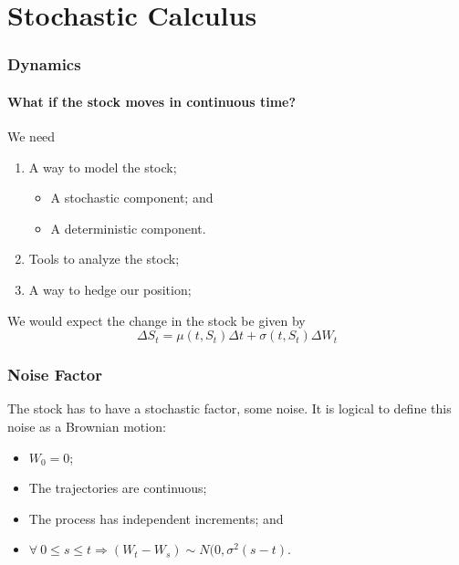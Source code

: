 \documentclass{beamer}
\begin{document}
\section{Stochastic Calculus}
\begin{frame}
\frametitle{Dynamics}
\framesubtitle{What if the stock moves in continuous time?}
We need
\begin{enumerate}
	\item A way to model the stock;
	\begin{itemize}
		\item A stochastic component; and
		\item A deterministic component.
	\end{itemize}
	\item Tools to analyze the stock;
	\item A way to hedge our position;
\end{enumerate}
	We would expect the change in the stock be given by
	\begin{equation}
		\Delta S_t = \mu(t, S_t) \Delta t + \sigma(t, S_t) \Delta W_t
	\end{equation}
\end{frame}

\begin{frame}
\frametitle{Noise Factor}
	The stock has to have a stochastic factor, some noise. It is logical to define this noise as a Brownian motion:
	\begin{definition}
	\begin{itemize}
		\item $W_0 = 0$;
		\item The trajectories are continuous; 
		\item The process has independent increments; and
		\item $\forall \ 0 \leq s \leq t \Longrightarrow (W_t - W_s) \sim N(0, \sigma^2(s - t)$.
	\end{itemize}
	\end{definition}
\end{frame}

%
\end{document}
